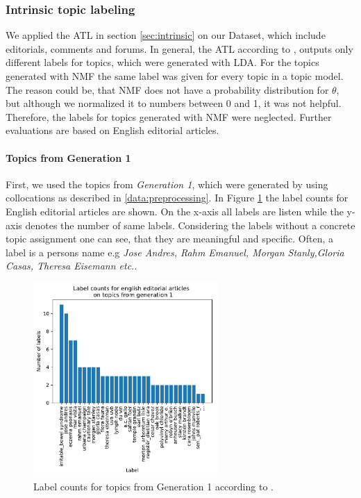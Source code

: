 {\subsubsection{Intrinsic topic labeling}
\label{eval:intrinsic}
We applied the \ac{ATL} in section \ref{sec:intrinsic} on our Dataset, which include editorials, comments and forums. In general, the \ac{ATL} according to \cite{Mei2007}, outputs only different labels for topics, which were generated with \ac{LDA}. For the topics generated with \ac{NMF} the same label was given for every topic in a topic model. The reason could be, that \ac{NMF} does not have a probability distribution for $\theta$, but although we normalized it to numbers between 0 and 1, it was not helpful. Therefore, the labels for topics generated with \ac{NMF} were neglected. Further evaluations are based on English editorial articles. 
\paragraph{Topics from Generation 1}
First, we used the topics from \textit{Generation 1}, which were generated by using collocations as described in \ref{data:preprocessing}. In Figure \ref{fig:labelcount_intrinsic} the label counts for English editorial articles are shown. On the x-axis all labels are listen while the y-axis denotes the number of same labels. 
Considering the labels without a concrete topic assignment one can see, that they are meaningful and specific. Often, a label is a persons name e.g {\textit{Jose Andres, Rahm Emanuel, Morgan Stanly,Gloria Casas, Theresa Eisemann etc.}}.
\begin{figure}[h]
	\centering
	\includegraphics[width=7cm]{gfx/POS-gen1/alte_topics.pdf}
	\caption[Label counts for topics from Generation 1 with intrinsic labeling]{Label counts for topics from Generation 1 according to \cite{Mei2007}.}
	\label{fig:labelcount_intrinsic}
\end{figure}

}

